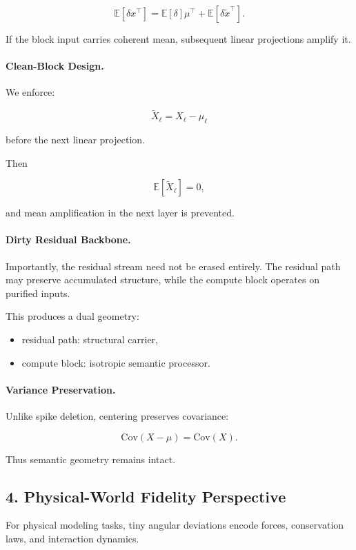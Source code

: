 \[
\mathbb{E}[\delta x^\top]
=
\mathbb{E}[\delta]\mu^\top
+
\mathbb{E}[\delta \tilde{x}^\top].
\]

If the block input carries coherent mean,
subsequent linear projections amplify it.

\paragraph{Clean-Block Design.}

We enforce:

\[
\widetilde{X}_\ell = X_\ell - \mu_\ell
\]

before the next linear projection.

Then

\[
\mathbb{E}[\widetilde{X}_\ell] = 0,
\]

and mean amplification in the next layer is prevented.

\paragraph{Dirty Residual Backbone.}

Importantly,
the residual stream need not be erased entirely.
The residual path may preserve accumulated structure,
while the compute block operates on purified inputs.

This produces a dual geometry:
\begin{itemize}
\item residual path: structural carrier,
\item compute block: isotropic semantic processor.
\end{itemize}

\paragraph{Variance Preservation.}

Unlike spike deletion,
centering preserves covariance:

\[
\mathrm{Cov}(X - \mu) = \mathrm{Cov}(X).
\]

Thus semantic geometry remains intact.

\subsection{4. Physical-World Fidelity Perspective}

For physical modeling tasks,
tiny angular deviations encode forces, conservation laws,
and interaction dynamics.

